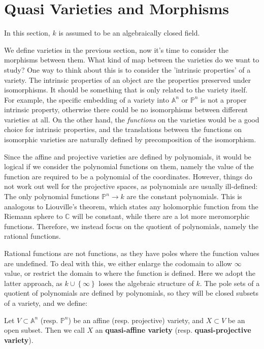 \documentclass{note-eng}
\begin{document}
\section{Quasi Varieties and Morphisms}

In this section, $k$ is assumed to be an algebraically closed field.

We define varieties in the previous section, now it's time to consider the morphisms between them. What kind of map between the varieties do we want to study? One way to think about this is to consider the 'intrinsic properties' of a variety. The intrinsic properties of an object are the properties preserved under isomorphisms. It should be something that is only related to the variety itself. For example, the specific embedding of a variety into $\mathbb{A}^n$ or $\mathbb{P}^n$ is not a proper intrinsic property, otherwise there could be no isomorphisms between different varieties at all. On the other hand, the \textit{functions} on the varieties would be a good choice for intrinsic properties, and the translations between the functions on isomorphic varieties are naturally defined by precomposition of the isomorphism.

Since the affine and projective varieties are defined by polynomials, it would be logical if we consider the polynomial functions on them, namely the value of the function are required to be a polynomial of the coordinates. However, things do not work out well for the projective spaces, as polynomials are usually ill-defined: The only polynomial functions $\mathbb{P}^n \rightarrow k$ are the constant polynomials. This is analogous to Liouville's theorem, which states any holomorphic function from the Riemann sphere to $\mathbb{C}$ will be constant, while there are a lot more meromorphic functions. Therefore, we instead focus on the quotient of polynomials, namely the rational functions.

Rational functions are not functions, as they have poles where the function values are undefined. To deal with this, we either enlarge the codomain to allow $\infty$ value, or restrict the domain to where the function is defined. Here we adopt the latter approach, as $k \cup \left\lbrace \infty \right\rbrace$ loses the algebraic structure of $k$. The pole sets of a quotient of polynomials are defined by polynomials, so they will be closed subsets of a variety, and we define:

\begin{definition}
    Let $V \subset \mathbb{A}^n$ (resp. $\mathbb{P}^n$) be an affine (resp. projective) variety, and $X \subset V$ be an open subset. Then we call $X$ an \textbf{quasi-affine variety} (resp. \textbf{quasi-projective variety}).
\end{definition}
\end{document}
